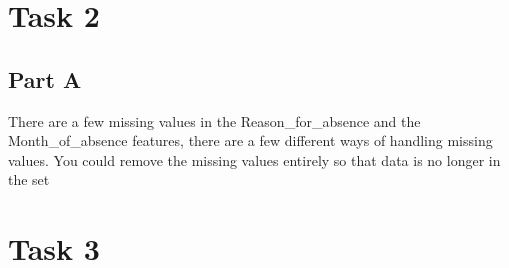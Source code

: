 \documentclass[10pt]{article}
\begin{document}
\section*{Task 2}

\subsection*{Part A}
There are a few missing values in the Reason\_for\_absence and the Month\_of\_absence features, there are a few different ways of handling missing values. You could remove the missing values entirely so that data is no longer in the set   

\section*{Task 3}



\nocite{*}

\end{document}
